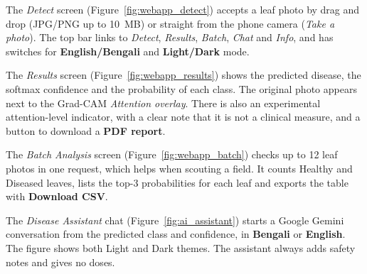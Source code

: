 The \textit{Detect} screen (Figure~\ref{fig:webapp_detect}) accepts a leaf photo by drag and drop (JPG/PNG up to 10~MB) or straight from the phone camera (\textit{Take a photo}). The top bar links to \textit{Detect}, \textit{Results}, \textit{Batch}, \textit{Chat} and \textit{Info}, and has switches for \textbf{English/Bengali} and \textbf{Light/Dark} mode.

The \textit{Results} screen (Figure~\ref{fig:webapp_results}) shows the predicted disease, the softmax confidence and the probability of each class. The original photo appears next to the Grad-CAM \textit{Attention overlay}. There is also an experimental attention-level indicator, with a clear note that it is not a clinical measure, and a button to download a \textbf{PDF report}.

The \textit{Batch Analysis} screen (Figure~\ref{fig:webapp_batch}) checks up to 12 leaf photos in one request, which helps when scouting a field. It counts Healthy and Diseased leaves, lists the top-3 probabilities for each leaf and exports the table with \textbf{Download CSV}.

The \textit{Disease Assistant} chat (Figure~\ref{fig:ai_assistant}) starts a Google Gemini conversation from the predicted class and confidence, in \textbf{Bengali} or \textbf{English}. The figure shows both Light and Dark themes. The assistant always adds safety notes and gives no doses.

